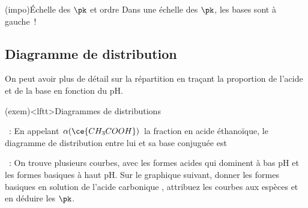 \documentclass[../../main/main.tex]{subfiles}
\begin{document}
\begin{tcb*}[sidebyside, righthand ratio=.25]
\begin{center}
		\captionsetup{justification=centering}
	\end{center}
\end{tcb*}
\begin{tcb*}(impo){Échelle des $\pk$ et ordre}
	Dans une échelle des $\pk$, les bases sont à gauche~!
\end{tcb*}

\subsection{Diagramme de distribution}
On peut avoir plus de détail sur la répartition en traçant la proportion de
l'acide et de la base en fonction du pH.
\begin{tcb*}[breakable](exem)<lftt>{Diagrammes de distributions}
	\begin{itemize}
		~:
		En appelant $\alpha(\ce{CH_3COOH})$ la fraction en acide éthanoïque, le
		diagramme de distribution entre lui et sa base conjuguée est
		\begin{center}
		\end{center}
		~:
		On trouve plusieurs courbes, avec les formes acides qui dominent à bas pH et
		les formes basiques à haut pH. Sur le graphique suivant, donner les formes
		basiques en solution de l'acide carbonique , attribuez les courbes
		aux espèces et en déduire les $\pk$.
		\begin{center}
			\sswitch{
}
\end{center}
\end{itemize}
\end{tcb*}
\end{document}
